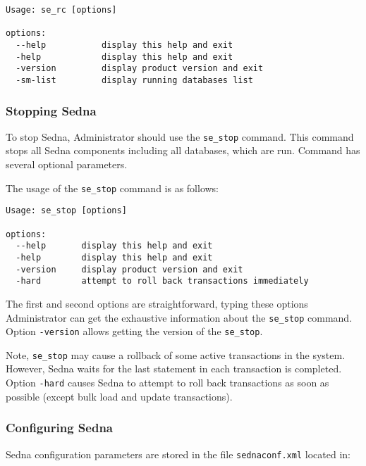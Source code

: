 \documentclass[a4paper,12pt]{article}
\begin{document}
\small{
\begin{verbatim}
Usage: se_rc [options]

options:
  --help           display this help and exit
  -help            display this help and exit
  -version         display product version and exit
  -sm-list         display running databases list
\end{verbatim}}


\subsubsection{Stopping Sedna}

To stop Sedna, Administrator should use the \verb!se_stop! command. This command
stops all Sedna components including all databases, which are run. Command has
several optional parameters.

The usage of the \verb!se_stop! command is as follows:

\small{
\begin{verbatim}
Usage: se_stop [options]

options:
  --help       display this help and exit
  -help        display this help and exit
  -version     display product version and exit
  -hard        attempt to roll back transactions immediately
\end{verbatim}}

The first and second options are straightforward, typing these options
Administrator can get the exhaustive information about the \verb!se_stop!
command. Option \verb!-version! allows getting the version of the
\verb!se_stop!.

Note, \verb!se_stop! may cause a rollback of some active transactions in the
system. However, Sedna waits for the last statement in each transaction is
completed. Option \verb!-hard! causes Sedna to attempt to roll back transactions
as soon as possible (except bulk load and update transactions).


\subsubsection{Configuring Sedna}
\label{sec:ConfigSedna}
Sedna configuration parameters are stored in the file \verb!sednaconf.xml!
located in:
\end{document}
